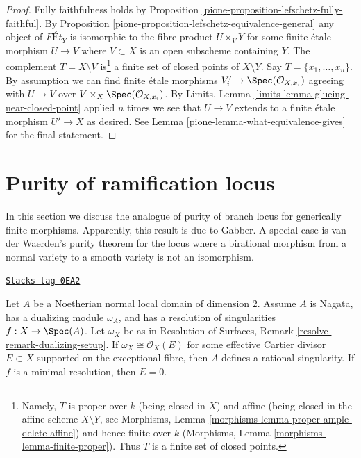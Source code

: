 \begin{proof}

Fully faithfulness holds by
Proposition \ref{pione-proposition-lefschetz-fully-faithful}.
By Proposition \ref{pione-proposition-lefschetz-equivalence-general}
any object of $\textit{F\'Et}_Y$
is isomorphic to the fibre product $U \times_V Y$ for some
finite \'etale morphism $U \to V$ where $V \subset X$
is an open subscheme containing $Y$.
The complement $T = X \setminus V$
is\footnote{Namely, $T$ is proper over $k$ (being closed in $X$)
and affine (being closed in the affine scheme $X \setminus Y$, see
Morphisms, Lemma \ref{morphisms-lemma-proper-ample-delete-affine})
and hence finite over $k$
(Morphisms, Lemma \ref{morphisms-lemma-finite-proper}).
Thus $T$ is a finite set of closed points.}
a finite set of closed points of $X \setminus Y$.
Say $T = \{x_1, \ldots, x_n\}$.
By assumption we can find finite \'etale morphisms
$V'_i \to \Spec(\mathcal{O}_{X, x_i})$ agreeing with
$U \to V$ over $V \times_X \Spec(\mathcal{O}_{X, x_i})$.
By Limits, Lemma \ref{limits-lemma-glueing-near-closed-point}
applied $n$ times we see that $U \to V$ extends to a finite \'etale
morphism $U' \to X$ as desired.
See Lemma \ref{pione-lemma-what-equivalence-gives} for the final statement.
\end{proof}

\section{Purity of ramification locus}
\label{pione-section-purity-ramification}
In this section we discuss the analogue of purity of branch locus for
generically finite morphisms. Apparently, this result is due to Gabber.
A special case is van der Waerden's purity theorem for the locus where
a birational morphism from a normal variety to a smooth variety is not
an isomorphism.

\begin{lemma}
\label{pione-lemma-characterize-rational-singularity}
\href{https://stacks.math.columbia.edu/tag/0EA2}{\texttt{Stacks tag 0EA2}}

Let $A$ be a Noetherian normal local domain of dimension $2$.
Assume $A$ is Nagata, has a dualizing module $\omega_A$, and has a
resolution of singularities $f : X \to \Spec(A)$.
Let $\omega_X$ be as in Resolution of Surfaces,
Remark \ref{resolve-remark-dualizing-setup}.
If $\omega_X \cong \mathcal{O}_X(E)$ for some effective
Cartier divisor $E \subset X$ supported on the exceptional
fibre, then $A$ defines a rational singularity.
If $f$ is a minimal resolution, then $E = 0$.
\end{lemma}

